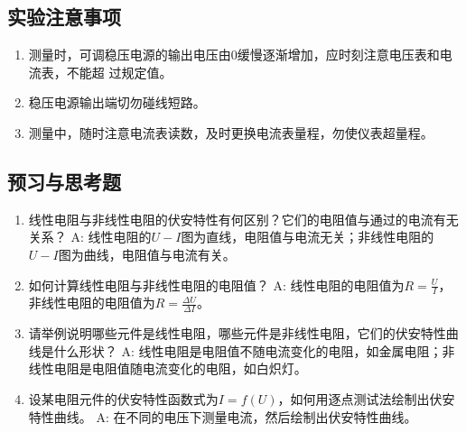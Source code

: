\documentclass[UTF8]{article}
\begin{document}
        \subsection{实验注意事项}
            \begin{enumerate}[label=\textbf{\arabic*}.]
                \item 测量时，可调稳压电源的输出电压由0缓慢逐渐增加，应时刻注意电压表和电流表，不能超
                过规定值。
                \item 稳压电源输出端切勿碰线短路。
                \item 测量中，随时注意电流表读数，及时更换电流表量程，勿使仪表超量程。
            \end{enumerate}
        \subsection{预习与思考题}
            \begin{enumerate}[label=\textbf{\arabic*}.]
                \item 线性电阻与非线性电阻的伏安特性有何区别？它们的电阻值与通过的电流有无关系？\newline
                A: 线性电阻的$U-I$图为直线，电阻值与电流无关；非线性电阻的$U-I$图为曲线，电阻值与电流有关。
                \item 如何计算线性电阻与非线性电阻的电阻值？\newline
                A: 线性电阻的电阻值为$R = \frac{U}{I}$，非线性电阻的电阻值为$R = \frac{\Delta U}{\Delta I}$。
                \item 请举例说明哪些元件是线性电阻，哪些元件是非线性电阻，它们的伏安特性曲线是什么形状？\newline
                A: 线性电阻是电阻值不随电流变化的电阻，如金属电阻；非线性电阻是电阻值随电流变化的电阻，如白炽灯。
                \item 设某电阻元件的伏安特性函数式为$I = f(U)$，如何用逐点测试法绘制出伏安特性曲线。\newline
                A: 在不同的电压下测量电流，然后绘制出伏安特性曲线。
            \end{enumerate}
\end{document}
